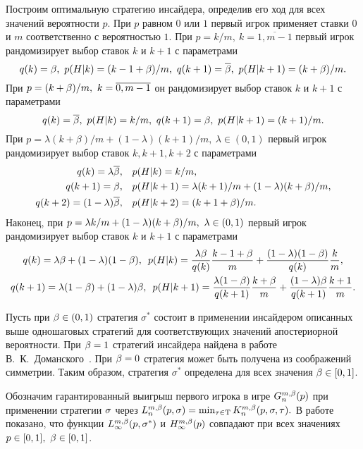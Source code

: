 Построим оптимальную стратегию инсайдера, определив его ход для всех значений вероятности $p$.
При $p$ равном $0$ или $1$ первый игрок применяет ставки $0$ и $m$ соответственно с вероятностью $1$.
При $p = k/m,\ k = \overline{1, m-1}$ первый игрок рандомизирует выбор ставок $k$ и $k+1$ с параметрами
\begin{equation*}
  q(k) = \beta,\ p(H|k) = (k-1+\beta)/m,\
  q(k+1) = {{\overline{\beta}}},\ p(H|k + 1) = (k+\beta)/m.
\end{equation*}
При $p = (k+\beta)/m,\ k = \overline{0, m-1}$ он рандомизирует выбор ставок $k$ и $k+1$ с параметрами
\begin{equation*}
  q(k) = {{\overline{\beta}}},\ p(H|k) = k/m,\
  q(k+1) = \beta,\ p(H|k+1) = (k+1)/m.
\end{equation*}
При $p = \lambda (k+\beta)/m + (1-\lambda) (k+1)/m,\ \lambda \in (0, 1)$ первый игрок рандомизирует выбор ставок $k, k+1, k+2$ с параметрами
\begin{align*}
  q(k) = \lambda{{\overline{\beta}}}, &\quad p(H|k) = k/m,\\
  q(k+1) = \beta, &\quad p(H|k+1) = \lambda (k+1)/m + (1-\lambda) (k+\beta)/m,\\
  q(k+2) = (1-\lambda){{\overline{\beta}}}, &\quad p(H|k+2) = (k+1+\beta)/m.
\end{align*}
Наконец, при $p = \lambda k/m + (1-\lambda) (k+\beta)/m,\ \lambda \in (0, 1)$ первый игрок рандомизирует выбор ставок $k$ и $k+1$ с параметрами
\begin{gather*}
  q(k) = \lambda\beta + (1-\lambda)(1-\beta),\enskip
  p(H|k) = \frac{\lambda\beta}{q(k)} \frac{k-1+\beta}{m} + \frac{(1-\lambda)(1-\beta)}{q(k)} \frac{k}{m},\\
  q(k+1) = \lambda(1-\beta) + (1-\lambda)\beta,\enskip
  p(H|k+1) = \frac{\lambda(1-\beta)}{q(k+1)} \frac{k+\beta}{m} + \frac{(1-\lambda)\beta}{q(k+1)} \frac{k+1}{m}.
\end{gather*}

Пусть при $\beta \in (0,1)$ стратегия $\sigma^*$ состоит в применении инсайдером описанных выше одношаговых стратегий для соответствующих значений апостериорной вероятности. 
При $\beta = 1$ стратегий инсайдера найдена в работе В.~К.~Доманского~\cite{domansky07}.
При $\beta = 0$ стратегия может быть получена из соображений симметрии. 
Таким образом, стратегия $\sigma^*$ определена для всех значения $\beta \in [0,1]$.

Обозначим гарантированный выигрыш первого игрока в игре $\theG*{n}(p)$ при применении стратегии $\sigma$ через
$
  \L*{n}(p, \sigmar) = \min_{\taur \in \Tau} \K*{n}(p,\sigmar,\taur).
$
В работе показано, что функции $\L*{\infty}(p, \sigmar^*)$ и $\H*{\infty}(p)$ совпадают при всех значениях $p \in [0,1],\ \beta \in [0,1]$.

